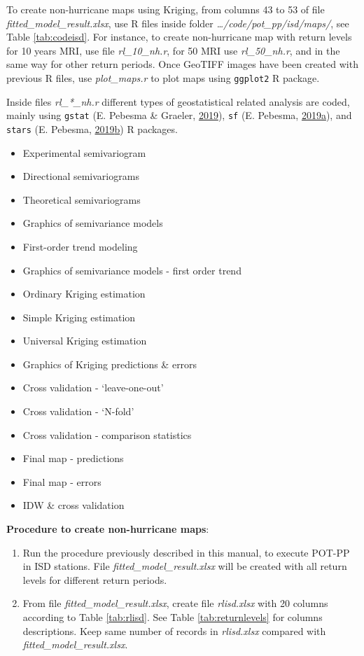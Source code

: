 \documentclass[12pt,oneside]{reedthesis}
\providecommand{\tightlist}{%
  \setlength{\itemsep}{0pt}\setlength{\parskip}{0pt}}
\begin{document}
To create non-hurricane maps using Kriging, from columns 43 to 53 of file \emph{fitted\_model\_result.xlsx}, use R files inside folder \emph{\ldots/code/pot\_pp/isd/maps/}, see Table \ref{tab:codeisd}. For instance, to create non-hurricane map with return levels for 10 years MRI, use file \emph{rl\_10\_nh.r}, for 50 MRI use \emph{rl\_50\_nh.r}, and in the same way for other return periods. Once GeoTIFF images have been created with previous R files, use \emph{plot\_maps.r} to plot maps using \texttt{ggplot2} R package.

Inside files \emph{rl\_*\_nh.r} different types of geostatistical related analysis are coded, mainly using \texttt{gstat} (E. Pebesma \& Graeler, \protect\hyperlink{ref-Pebesma2019}{2019}), \texttt{sf} (E. Pebesma, \protect\hyperlink{ref-Pebesma2019a}{2019}\protect\hyperlink{ref-Pebesma2019a}{a}), and \texttt{stars} (E. Pebesma, \protect\hyperlink{ref-Pebesma2019b}{2019}\protect\hyperlink{ref-Pebesma2019b}{b}) R packages.
\begin{itemize}
\tightlist
\item
  Experimental semivariogram
\item
  Directional semivariograms
\item
  Theoretical semivariograms
\item
  Graphics of semivariance models
\item
  First-order trend modeling
\item
  Graphics of semivariance models - first order trend
\item
  Ordinary Kriging estimation
\item
  Simple Kriging estimation
\item
  Universal Kriging estimation
\item
  Graphics of Kriging predictions \& errors
\item
  Cross validation - `leave-one-out'
\item
  Cross validation - `N-fold'
\item
  Cross validation - comparison statistics
\item
  Final map - predictions
\item
  Final map - errors
\item
  IDW \& cross validation
\end{itemize}
\textbf{Procedure to create non-hurricane maps}:
\begin{enumerate}
\def\labelenumi{\arabic{enumi}.}
\item
  Run the procedure previously described in this manual, to execute POT-PP in ISD stations. File \emph{fitted\_model\_result.xlsx} will be created with all return levels for different return periods.
\item
  From file \emph{fitted\_model\_result.xlsx}, create file \emph{rlisd.xlsx} with 20 columns according to Table \ref{tab:rlisd}. See Table \ref{tab:returnlevels} for columns descriptions. Keep same number of records in \emph{rlisd.xlsx} compared with \emph{fitted\_model\_result.xlsx}.
\end{enumerate}
\end{document}
